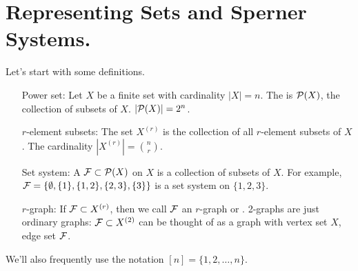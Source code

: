 
 \section{Representing Sets and Sperner Systems.}
Let's start with some definitions. 
\begin{itemize}[]
\item[Power set:] 
Let $X$ be a finite set with cardinality $|X| = n$. The  is $\P(X)$, the collection of subsets of $X$. $|\P(X)|= 2^n$.
\item[$r$-element subsets:] 
The set $X^{(r)}$ is the collection of all $r$-element subsets of $X$. The cardinality $|X^{(r)}| = {n\choose r}$.
\item[Set system:]
A  $\F \subset \P(X)$ on $X$ is a collection of subsets of $X$. For example, $\F = \{\emptyset, \{1\}, \{1,2\}, \{2,3\},\{3\}\}$ is a set system on $\{1,2,3\}$.
\item[$r$-graph:]
If $\F\subset X^{(r)}$, then we call $\F$ an $r$-graph or . 2-graphs are just ordinary graphs: $\F\subset X^{(2)}$ can be thought of as a graph with vertex set $X$, edge set $\F$.
\end{itemize}
We'll also frequently use the notation $[n] = \{1,2,\dotsc,n\}$.

